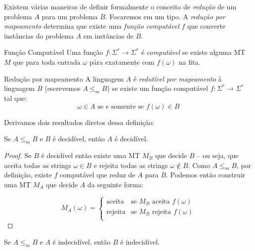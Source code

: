 Existem várias maneiras de definir formalmente o conceito de {\em redução} de um problema $A$ para um problema $B$.
Focaremos em um tipo.
A {\em redução por mapeamento} determina que existe uma {\em função computável} $f$ que converte instâncias do problema $A$ em instâncias de $B$.

\begin{definition}{Função Computável}
  Uma função $f: \Sigma^* \to \Sigma^*$ é {\em computável} se existe alguma MT $M$ que para toda entrada $\omega$ pára exatamente com $f(\omega)$ na fita.
\end{definition}

\begin{definition}{Redução por mapeamento}
  A linguagem $A$ é {\em redutível por mapeamento} à linguagem $B$ (escrevemos $A \leq_m B$) se existe um função computável $f : \Sigma^* \to \Sigma^*$ tal que:
  \begin{displaymath}
    \omega \in A \textrm{ se e somente se } f(\omega) \in B
  \end{displaymath}
\end{definition}

Derivamos dois resultados diretos dessa definição:

\begin{corollary}
  Se $A \leq_m B$ e $B$ é decidível, então $A$ é decidível.
\end{corollary}
\begin{proof}
  Se $B$ é decidível então existe uma MT $M_B$ que decide $B$ -- ou seja, que aceita todas as strings $\omega \in B$ e rejeita todas as strings $\omega \notin B$.
  Como $A \leq_m B$, por definição, existe $f$ computável que reduz de $A$ para $B$.
  Podemos então construir uma MT $M_A$ que decide $A$ da seguinte forma:

 \begin{displaymath}
    M_A(\omega) = \left\{\begin{array}{cl}
                 \textrm{aceita} & \textrm{se $M_B$ aceita $f(\omega)$}\\
                 \textrm{rejeita} & \textrm{se $M_B$ rejeita $f(\omega)$}\\ 
               \end{array}\right.
  \end{displaymath}  
\end{proof}

\begin{corollary}
  Se $A \leq_m B$ e $A$ é indecidível, então $B$ é indecidível.
\end{corollary}

